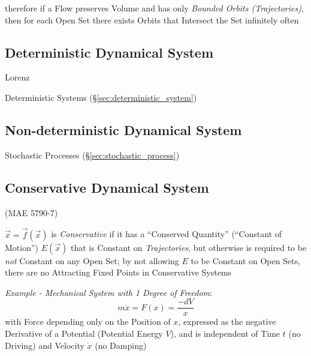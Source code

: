 therefore if a Flow preserves Volume and has only \emph{Bounded Orbits
  (Trajectories)}, then for each Open Set there exists Orbits that Intersect
the Set infinitely often



\subsection{Deterministic Dynamical System}
\label{sec:deterministic_dynamical_system}

Lorenz

\fist Deterministic Systems (\S\ref{sec:deterministic_system})



\subsection{Non-deterministic Dynamical System}
\label{sec:nondeterministic_dynamical_system}

\fist Stochastic Processes (\S\ref{sec:stochastic_process})



\subsection{Conservative Dynamical System}
\label{sec:conservative_dynamical_system}

(MAE 5790-7)

$\dot{\vec{x}} = \vec{f}(\vec{x})$ is \emph{Conservative} if it has a
``Conserved Quantity'' (``Constant of Motion'') $E(\vec{x})$ that is Constant
on \emph{Trajectories}, but otherwise is required to be \emph{not} Constant on
any Open Set;
by not allowing $E$ to be Constant on Open Sets, there are no Attracting Fixed
Points in Conservative Systems

\emph{Example - Mechanical System with 1 Degree of Freedom}:
\[
  m\ddot{x} = F(x) = \frac{-dV}{x}
\]
with Force depending only on the Position of $x$, expressed as the negative
Derivative of a Potential (Potential Energy $V$), and is independent of Time
$t$ (no Driving) and Velocity $\dot{x}$ (no Damping)

